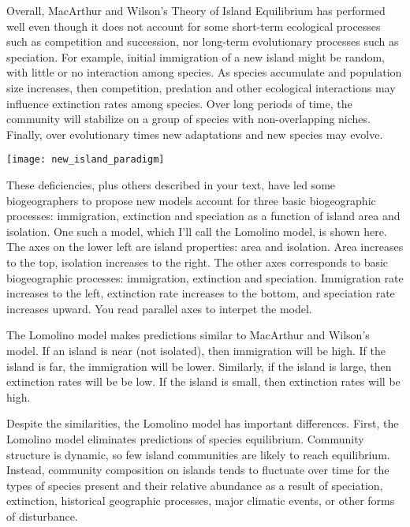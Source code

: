 \documentclass[letterpaper]{tufte-handout}
\begin{document}
Overall, MacArthur and Wilson's Theory of Island Equilibrium has performed well even though it does not account for some short-term ecological processes such as competition and succession, nor long-term evolutionary processes such as speciation. For example, initial immigration of a new island might be random, with little or no interaction among species.  As species accumulate and population size increases, then competition, predation and other ecological interactions may influence extinction rates among species. Over long periods of time, the community will stabilize on a group of species with non-overlapping niches.  Finally, over evolutionary times new adaptations and new species may evolve.

\begin{marginfigure}%
	\centering
	\texttt{[image: new\_island\_paradigm]}
\end{marginfigure} 

These deficiencies, plus others described in your text, have led some biogeographers to propose new models account for three basic biogeographic processes: immigration, extinction and speciation as a function of island area and isolation.  One such a model, which I'll call the Lomolino model, is shown here. The axes on the lower left are island properties:  area and isolation.  Area increases to the top, isolation increases to the right.  The other axes corresponds to basic biogeographic processes: immigration, extinction and speciation.  Immigration rate increases to the left, extinction rate increases to the bottom, and speciation rate increases upward. You read parallel axes to interpet the model.

The Lomolino model makes predictions similar to MacArthur and Wilson's model.  If an island is near (not isolated), then immigration will be high. If the island is far, the immigration will be lower. Similarly, if the island is large, then extinction rates will be be low. If the island is small, then extinction rates will be high.

Despite the similarities, the Lomolino model has important differences. First, the Lomolino model eliminates predictions of species equilibrium.  Community structure is dynamic, so few island communities are likely to reach equilibrium.  Instead, community composition on islands tends to fluctuate over time for the  types of species present and their relative abundance as a result of speciation, extinction, historical geographic processes, major climatic events, or other forms of disturbance. 
\end{document}
